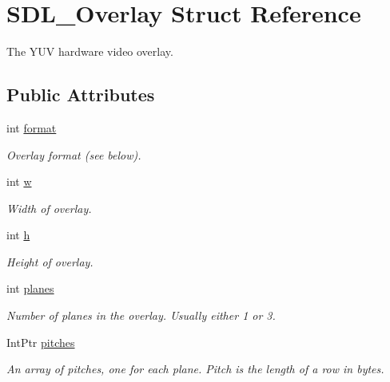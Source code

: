 \hypertarget{struct_s_d_l___overlay}{
\section{SDL\_\-Overlay Struct Reference}
\label{struct_s_d_l___overlay}
}


The YUV hardware video overlay.  


\subsection*{Public Attributes}
\begin{DoxyCompactItemize}
\item 
int \hyperlink{struct_s_d_l___overlay_a9d5fe04787193aff557a6c7b85d2c96b}{format}
\begin{DoxyCompactList}\small\item\em Overlay format (see below). \item\end{DoxyCompactList}\item 
int \hyperlink{struct_s_d_l___overlay_aefb7ffc39023d6052156218b9395cc10}{w}
\begin{DoxyCompactList}\small\item\em Width of overlay. \item\end{DoxyCompactList}\item 
int \hyperlink{struct_s_d_l___overlay_a86a1db38b124d4c565a798de82f2fa22}{h}
\begin{DoxyCompactList}\small\item\em Height of overlay. \item\end{DoxyCompactList}\item 
int \hyperlink{struct_s_d_l___overlay_ae03a414d95c2d83ca7dc09dd11295feb}{planes}
\begin{DoxyCompactList}\small\item\em Number of planes in the overlay. Usually either 1 or 3. \item\end{DoxyCompactList}\item 
IntPtr \hyperlink{struct_s_d_l___overlay_acebfa6c0acae264fc7c5520d8d78341f}{pitches}
\begin{DoxyCompactList}\small\item\em An array of pitches, one for each plane. Pitch is the length of a row in bytes. \item\end{DoxyCompactList}\item 

\end{DoxyCompactItemize}
